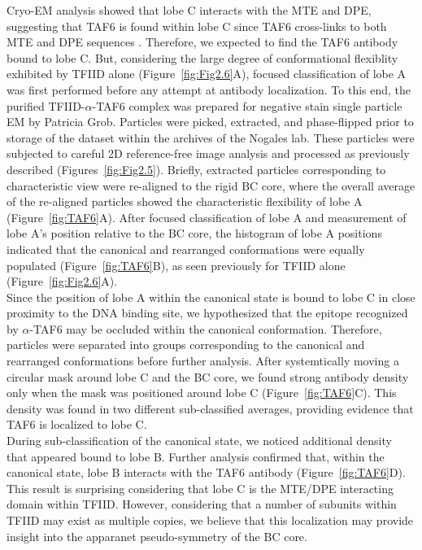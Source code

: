 Cryo-EM analysis showed that lobe C interacts with the MTE and DPE, suggesting that TAF6 is found within lobe C since TAF6 cross-links to both MTE and DPE sequences \cite{Burke_2739,Lim_1522}. Therefore, we expected to find the TAF6 antibody bound to lobe C. But, considering the large degree of conformational flexiblity exhibited by TFIID alone (Figure~\ref{fig:Fig2.6}A), focused classification of lobe A was first performed before any attempt at antibody localization. To this end, the purified TFIID-$\alpha$-TAF6 complex was prepared for negative stain single particle EM by Patricia Grob. Particles were picked, extracted, and phase-flipped prior to storage of the dataset within the archives of the Nogales lab. These particles were subjected to careful 2D reference-free image analysis and processed as previously described (Figures~\ref{fig:Fig2.5}). Briefly, extracted particles corresponding to characteristic view were re-aligned to the rigid BC core, where the overall average of the re-aligned particles showed the characteristic flexibility of lobe A (Figure~\ref{fig:TAF6}A). After focused classification of lobe A and measurement of lobe A's position relative to the BC core, the histogram of lobe A positions indicated that the canonical and rearranged conformations were equally populated (Figure~\ref{fig:TAF6}B), as seen previously for TFIID alone (Figure~\ref{fig:Fig2.6}A). \\
\indent Since the position of lobe A within the canonical state is bound to lobe C in close proximity to the DNA binding site, we hypothesized that the epitope recognized by $\alpha$-TAF6 may be occluded within the canonical conformation. Therefore, particles were separated into groups corresponding to the canonical and rearranged conformations before further analysis. After systemtically moving a circular mask around lobe C and the BC core, we found strong antibody density only when the mask was positioned around lobe C (Figure~\ref{fig:TAF6}C). This density was found in two different sub-classified averages, providing evidence that TAF6 is localized to lobe C. \\
\indent During sub-classification of the canonical state, we noticed additional density that appeared bound to lobe B. Further analysis confirmed that, within the canonical state, lobe B interacts with the TAF6 antibody (Figure~\ref{fig:TAF6}D). This result is surprising considering that lobe C is the MTE/DPE interacting domain within TFIID. However, considering that a number of subunits within TFIID may exist as multiple copies, we believe that this localization may provide insight into the apparanet pseudo-symmetry of the BC core.

